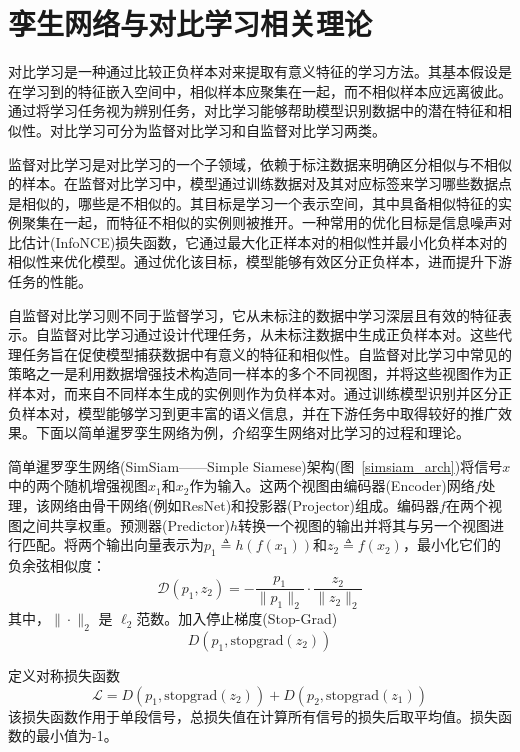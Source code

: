 \documentclass[master]{thesis-uestc}
\begin{document}
\section{孪生网络与对比学习相关理论}
对比学习是一种通过比较正负样本对来提取有意义特征的学习方法。其基本假设是在学习到的特征嵌入空间中，相似样本应聚集在一起，而不相似样本应远离彼此。通过将学习任务视为辨别任务，对比学习能够帮助模型识别数据中的潜在特征和相似性。对比学习可分为监督对比学习和自监督对比学习两类。

监督对比学习是对比学习的一个子领域，依赖于标注数据来明确区分相似与不相似的样本。在监督对比学习中，模型通过训练数据对及其对应标签来学习哪些数据点是相似的，哪些是不相似的。其目标是学习一个表示空间，其中具备相似特征的实例聚集在一起，而特征不相似的实例则被推开。一种常用的优化目标是信息噪声对比估计(InfoNCE)损失函数，它通过最大化正样本对的相似性并最小化负样本对的相似性来优化模型。通过优化该目标，模型能够有效区分正负样本，进而提升下游任务的性能。

自监督对比学习则不同于监督学习，它从未标注的数据中学习深层且有效的特征表示。自监督对比学习通过设计代理任务，从未标注数据中生成正负样本对。这些代理任务旨在促使模型捕获数据中有意义的特征和相似性。自监督对比学习中常见的策略之一是利用数据增强技术构造同一样本的多个不同视图，并将这些视图作为正样本对，而来自不同样本生成的实例则作为负样本对。通过训练模型识别并区分正负样本对，模型能够学习到更丰富的语义信息，并在下游任务中取得较好的推广效果。下面以简单暹罗孪生网络为例，介绍孪生网络对比学习的过程和理论。

简单暹罗孪生网络(SimSiam——Simple Siamese)架构(图~\ref{simsiam_arch})将信号$x$中的两个随机增强视图$x_1$和$x_2$作为输入。这两个视图由编码器(Encoder)网络$f$处理，该网络由骨干网络(例如ResNet)和投影器(Projector)组成。编码器$f$在两个视图之间共享权重。预测器(Predictor)$h$转换一个视图的输出并将其与另一个视图进行匹配。将两个输出向量表示为$p_1 \triangleq h(f(x_1))$和$z_2 \triangleq f(x_2)$，最小化它们的负余弦相似度：
\begin{equation}
    \mathcal{D}(p_1, z_2) = -\frac{p_1}{\|p_1\|_2} \cdot \frac{z_2}{\|z_2\|_2}
    \label{eq:distance}
\end{equation}  
其中，$\|\cdot\|_2$ 是 $\ell_2$范数。加入停止梯度(Stop-Grad)
\begin{equation}
    D(p_1, \text{stopgrad}(z_2))
    \label{eq:sg_cos_loss}
\end{equation}

定义对称损失函数
\begin{equation}
    \mathcal{L} = D(p_1, \text{stopgrad}(z_2)) + D(p_2, \text{stopgrad}(z_1))
\label{eq:cos_loss}
\end{equation}
该损失函数作用于单段信号，总损失值在计算所有信号的损失后取平均值。损失函数的最小值为-1。
\end{document}
